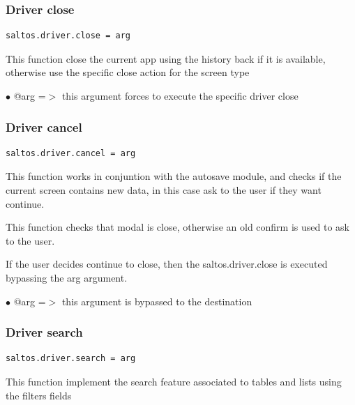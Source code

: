 \documentclass[a4paper]{article}
\begin{document}
\hypertarget{toc170}{}
\subsubsection{Driver close}

\begin{lstlisting}
saltos.driver.close = arg
\end{lstlisting}

This function close the current app using the history back if it is available,
otherwise use the specific close action for the screen type

\begin{compactitem}
\item[\color{myblue}$\bullet$] @arg =$>$ this argument forces to execute the specific driver close
\end{compactitem}

\hypertarget{toc171}{}
\subsubsection{Driver cancel}

\begin{lstlisting}
saltos.driver.cancel = arg
\end{lstlisting}

This function works in conjuntion with the autosave module, and checks if the
current screen contains new data, in this case ask to the user if they want
continue.

This function checks that modal is close, otherwise an old confirm is used
to ask to the user.

If the user decides continue to close, then the saltos.driver.close is executed
bypassing the arg argument.

\begin{compactitem}
\item[\color{myblue}$\bullet$] @arg =$>$ this argument is bypassed to the destination
\end{compactitem}

\hypertarget{toc172}{}
\subsubsection{Driver search}

\begin{lstlisting}
saltos.driver.search = arg
\end{lstlisting}

This function implement the search feature associated to tables and lists
using the filters fields
\end{document}
